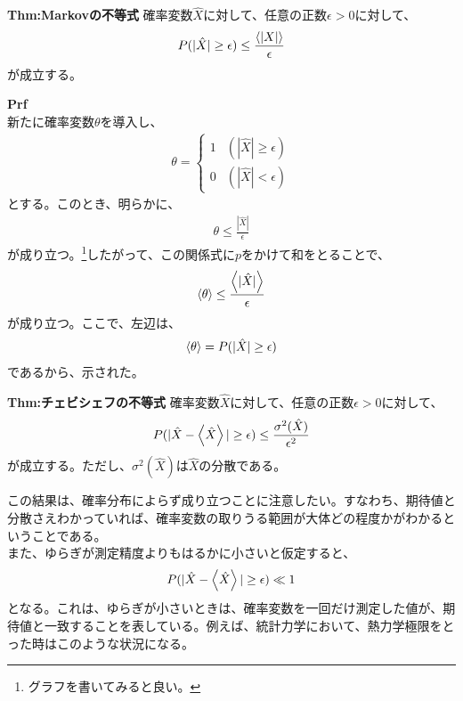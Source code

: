 \documentclass[a4paper,11pt]{jsarticle}
\numberwithin{equation}{section}
\begin{document}
\begin{itembox}[l]{\textbf{Thm:Markovの不等式}}
  確率変数$\hat{X}$に対して、任意の正数$\epsilon > 0$に対して、
  \begin{align}
    P(|\hat{X} | \geq \epsilon) \leq \frac{\expval{|X|}}{\epsilon}
  \end{align}
  が成立する。

\end{itembox}
\textbf{Prf}\\
新たに確率変数$\theta$を導入し、
\begin{align}
  \theta = \begin{cases}
    1 & (|\hat{X}| \geq \epsilon)\\
    0 & (|\hat{X}| < \epsilon)
  \end{cases}
\end{align}
とする。このとき、明らかに、
\begin{align}
  \theta \leq \frac{|\hat{X}|}{\epsilon}
\end{align}
が成り立つ。\footnote{グラフを書いてみると良い。}したがって、この関係式に$p$をかけて和をとることで、
\begin{align}
  \ev{\theta} \leq \frac{\expval{|\hat{X}|}}{\epsilon}
\end{align}
が成り立つ。ここで、左辺は、
\begin{align}
  \ev{\theta} = P(|\hat{X} | \geq \epsilon)
\end{align}
であるから、示された。\hfill\qedsymbol\\


\begin{itembox}[l]{\textbf{Thm:チェビシェフの不等式}}
  確率変数$\hat{X}$に対して、任意の正数$\epsilon > 0$に対して、
  \begin{align}
    P(|\hat{X} - \expval{\hat{X}}| \geq \epsilon) \leq \frac{\sigma^2(\hat{X})}{\epsilon^2}
  \end{align}
  が成立する。ただし、$\sigma^2(\hat{X})$は$\hat{X}$の分散である。

\end{itembox}
この結果は、確率分布によらず成り立つことに注意したい。すなわち、期待値と分散さえわかっていれば、確率変数の取りうる範囲が大体どの程度かがわかるということである。\\
また、ゆらぎが測定精度よりもはるかに小さいと仮定すると、
\begin{align}
  P(|\hat{X} - \expval{\hat{X}}| \geq \epsilon) \ll 1
\end{align}
となる。これは、ゆらぎが小さいときは、確率変数を一回だけ測定した値が、期待値と一致することを表している。例えば、統計力学において、熱力学極限をとった時はこのような状況になる。\\
\end{document}
